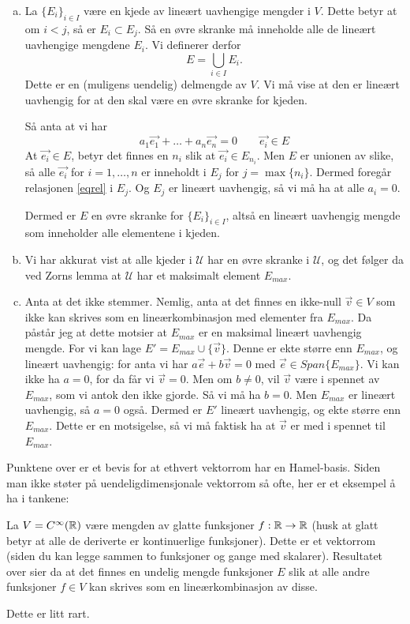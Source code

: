 \documentclass[11pt, norsk]{article}
\begin{document}
\begin{enumerate}[a)]
\item La $\{ E_i\}_{i \in I}$ være en kjede av lineært uavhengige mengder i $V$. Dette betyr at om $i < j$, så er $E_i \subset E_j$. Så en øvre skranke må inneholde alle de lineært uavhengige mengdene $E_i$. Vi definerer derfor
$$
E = \bigcup_{i \in I} E_i. 
$$
Dette er en (muligens uendelig) delmengde av $V$. Vi må vise at den er lineært uavhengig for at den skal være en øvre skranke for kjeden. 

Så anta at vi har
\begin{equation}
\label{eqrel}
a_1 \vec {e_1}+\ldots+a_n \vec {e_n}=0 \qquad  \vec {e_i} \in E
\end{equation}
At $\vec {e_i} \in E$, betyr det   finnes en $n_i$ slik at $\vec {e_i} \in E_{n_i}$. Men $E$ er unionen av slike, så alle $\vec {e_i}$ for $i=1,\ldots,n$ er inneholdt i $E_j$ for $j=\max\{ n_i\}$. Dermed foregår relasjonen \eqref{eqrel} i $E_j$. Og $E_j$ er lineært uavhengig, så vi må ha at alle $a_i=0$.

Dermed er $E$ en øvre skranke for $\{ E_i \}_{i \in I}$, altså en lineært uavhengig mengde som inneholder alle elementene i kjeden.
\item Vi har akkurat vist at alle kjeder i $\mathscr U$ har en øvre skranke i $\mathscr U$, og det følger da ved Zorns lemma at $\mathscr U$ har et maksimalt element $E_{max}$.
\item Anta at det ikke stemmer. Nemlig, anta at det finnes en ikke-null $\vec v \in V$ som ikke kan skrives som en lineærkombinasjon med elementer fra $E_{max}$. Da påstår jeg at dette motsier at $E_{max}$ er en maksimal lineært uavhengig mengde. For vi kan lage $E' = E_{max} \cup \{ \vec v \}$. Denne er ekte større enn $E_{max}$, og lineært uavhengig: for anta vi har $a\vec e + b \vec v = 0$ med $\vec e \in Span \{ E_{max} \}$. Vi kan ikke ha $a=0$, for da får vi $\vec v =0$. Men om $b \neq 0$, vil $\vec v$ være i spennet av $E_{max}$, som vi antok den ikke gjorde. Så vi må ha $b = 0$. Men $E_{max}$ er lineært uavhengig, så $a=0$ også. Dermed er $E'$ lineært uavhengig, og ekte større enn $E_{max}$. Dette er en motsigelse, så vi må faktisk ha at $\vec v$ er med i spennet til $E_{max}$. 
\end{enumerate}

Punktene over er et bevis for at ethvert vektorrom har en Hamel-basis. Siden man ikke støter på uendeligdimensjonale vektorrom så ofte, her er et eksempel å ha i tankene:
\begin{example}
La $V = C^\infty(\mathbb{R})$ være mengden av glatte funksjoner $f:\mathbb{R} \to \mathbb{R}$ (husk at glatt betyr at alle de deriverte er kontinuerlige funksjoner). Dette er et vektorrom (siden du kan legge sammen to funksjoner og gange med skalarer). Resultatet over sier da at det finnes en undelig mengde funksjoner $E$ slik at alle andre funksjoner $f \in V$ kan skrives som en lineærkombinasjon av disse.

Dette er litt rart.
\end{example}
\end{document}
